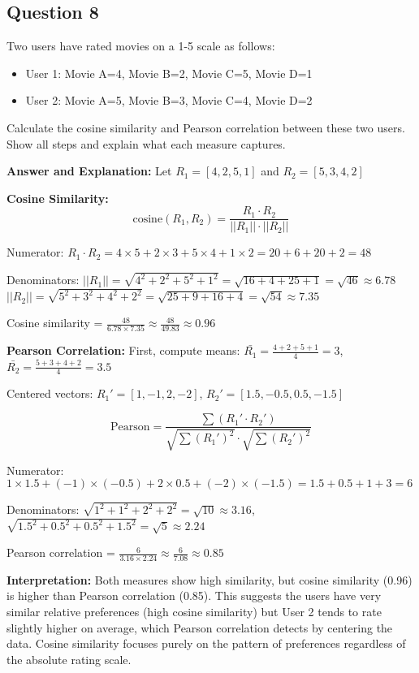 \documentclass[11pt]{article}
\newenvironment{answer}{\color{answercolor}\begin{framed}\textbf{Answer and Explanation:}}{\end{framed}}
\begin{document}
\subsection{Question 8}
Two users have rated movies on a 1-5 scale as follows:
\begin{itemize}
\item User 1: Movie A=4, Movie B=2, Movie C=5, Movie D=1
\item User 2: Movie A=5, Movie B=3, Movie C=4, Movie D=2  
\end{itemize}

Calculate the cosine similarity and Pearson correlation between these two users. Show all steps and explain what each measure captures.

\begin{answer}
Let $R_1 = [4, 2, 5, 1]$ and $R_2 = [5, 3, 4, 2]$

\textbf{Cosine Similarity:}
$$\text{cosine}(R_1, R_2) = \frac{R_1 \cdot R_2}{||R_1|| \cdot ||R_2||}$$

Numerator: $R_1 \cdot R_2 = 4 \times 5 + 2 \times 3 + 5 \times 4 + 1 \times 2 = 20 + 6 + 20 + 2 = 48$

Denominators: 
$||R_1|| = \sqrt{4^2 + 2^2 + 5^2 + 1^2} = \sqrt{16 + 4 + 25 + 1} = \sqrt{46} \approx 6.78$
$||R_2|| = \sqrt{5^2 + 3^2 + 4^2 + 2^2} = \sqrt{25 + 9 + 16 + 4} = \sqrt{54} \approx 7.35$

Cosine similarity = $\frac{48}{6.78 \times 7.35} \approx \frac{48}{49.83} \approx 0.96$

\textbf{Pearson Correlation:}
First, compute means: $\bar{R_1} = \frac{4+2+5+1}{4} = 3$, $\bar{R_2} = \frac{5+3+4+2}{4} = 3.5$

Centered vectors: $R_1' = [1, -1, 2, -2]$, $R_2' = [1.5, -0.5, 0.5, -1.5]$

$$\text{Pearson} = \frac{\sum(R_1' \cdot R_2')}{\sqrt{\sum(R_1')^2} \cdot \sqrt{\sum(R_2')^2}}$$

Numerator: $1 \times 1.5 + (-1) \times (-0.5) + 2 \times 0.5 + (-2) \times (-1.5) = 1.5 + 0.5 + 1 + 3 = 6$

Denominators: $\sqrt{1^2 + 1^2 + 2^2 + 2^2} = \sqrt{10} \approx 3.16$, $\sqrt{1.5^2 + 0.5^2 + 0.5^2 + 1.5^2} = \sqrt{5} \approx 2.24$

Pearson correlation = $\frac{6}{3.16 \times 2.24} \approx \frac{6}{7.08} \approx 0.85$

\textbf{Interpretation:} Both measures show high similarity, but cosine similarity (0.96) is higher than Pearson correlation (0.85). This suggests the users have very similar relative preferences (high cosine similarity) but User 2 tends to rate slightly higher on average, which Pearson correlation detects by centering the data. Cosine similarity focuses purely on the pattern of preferences regardless of the absolute rating scale.
\end{answer}
\end{document}
